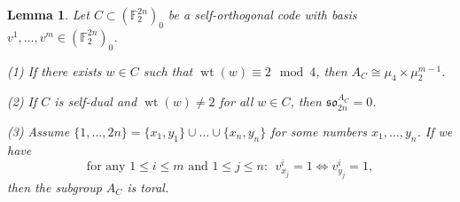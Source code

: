 \documentclass[12pt]{amsart}
\numberwithin{equation}{section}
\newtheorem{lemma}[theorem]{Lemma}
\theoremstyle{remark}
\newcommand{\wt}{\operatorname{wt}}
\newcommand{\bF}{\mathbb{F}}
\begin{document}
\begin{lemma}\label{lem.depth_in_Spin}
    Let $C\subset (\bF_2^{2n})_0$ be a self-orthogonal code with basis $v^1,\dots,v^m \in (\bF_2^{2n})_0$. 
    
   \smallskip
   (1) If there exists $w\in C$ such that $\wt(w)\equiv 2\mod 4$, then $A_C \cong \mu_4\times \mu_2^{m-1}$.
    
   \smallskip
   (2) If $C$ is self-dual and $\wt(w)\neq 2$ for all $w\in C$, then $\mathfrak {so}_{2n}^{A_C} = 0$.   

   \smallskip
   (3) Assume $\{1,\dots,2n\} = \{x_1,y_1\}\cup\dots\cup \{x_{n},y_n\}$ for some numbers $x_1,\dots,y_n$. If we have
   \begin{equation}\label{e.torality_in_spin}
    \text{for any }1\leqslant i\leqslant m\text{ and  }1\leqslant j\leqslant n: \ \ v^i_{x_j} = 1 \iff v^i_{y_j}=1,
\end{equation}
   then the subgroup $A_C$ is toral.
\end{lemma}
\end{document}
